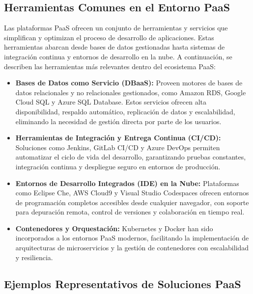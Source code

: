 {        \subsection{Herramientas Comunes en el Entorno PaaS}    
            Las plataformas PaaS ofrecen un conjunto de herramientas y servicios que simplifican y optimizan el proceso de desarrollo de aplicaciones. Estas herramientas abarcan desde bases de datos gestionadas hasta sistemas de integración continua y entornos de desarrollo en la nube. A continuación, se describen las herramientas más relevantes dentro del ecosistema PaaS:
            
            \begin{itemize}
                \item \textbf{Bases de Datos como Servicio (DBaaS):} Proveen motores de bases de datos relacionales y no relacionales gestionados, como Amazon RDS, Google Cloud SQL y Azure SQL Database. Estos servicios ofrecen alta disponibilidad, respaldo automático, replicación de datos y escalabilidad, eliminando la necesidad de gestión directa por parte de los usuarios.
                
                \item \textbf{Herramientas de Integración y Entrega Continua (CI/CD):} Soluciones como Jenkins, GitLab CI/CD y Azure DevOps permiten automatizar el ciclo de vida del desarrollo, garantizando pruebas constantes, integración continua y despliegue seguro en entornos de producción.
                
                \item \textbf{Entornos de Desarrollo Integrados (IDE) en la Nube:} Plataformas como Eclipse Che, AWS Cloud9 y Visual Studio Codespaces ofrecen entornos de programación completos accesibles desde cualquier navegador, con soporte para depuración remota, control de versiones y colaboración en tiempo real.
                
                \item \textbf{Contenedores y Orquestación:} Kubernetes y Docker han sido incorporados a los entornos PaaS modernos, facilitando la implementación de arquitecturas de microservicios y la gestión de contenedores con escalabilidad y resiliencia.
            \end{itemize}

            \subsection{Ejemplos Representativos de Soluciones PaaS}
        
}
